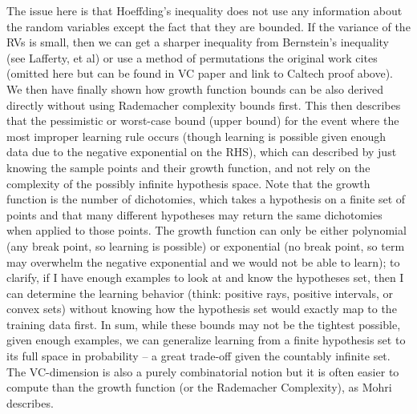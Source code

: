 \begin{flushleft}
	The issue here is that Hoeffding's inequality does not use any information
	about the random variables except the fact that they are bounded. If the
	variance of the RVs is small, then we can get a sharper inequality from
	Bernstein's inequality (see Lafferty, et al) or use a method of permutations
	the original work cites (omitted here but can be found in VC paper and link to
	Caltech proof above). We then have finally shown how growth function bounds can
	be also derived directly without using Rademacher complexity bounds first. This
	then describes that the pessimistic or worst-case bound (upper bound) for the
	event where the most improper learning rule occurs (though learning is possible
	given enough data due to the negative exponential on the RHS), which can
	described by just knowing the sample points and their growth function, and not
	rely on the complexity of the possibly infinite hypothesis space. Note that the
	growth function is the number of dichotomies, which takes a hypothesis on a
	finite set of points and that many different hypotheses may return the same
	dichotomies when applied to those points. The growth function can only be
	either polynomial (any break point, so learning is possible) or exponential (no
	break point, so term may overwhelm the negative exponential and we would not be
	able to learn); to clarify, if I have enough examples to look at and know the
	hypotheses set, then I can determine the learning behavior (think: positive
	rays, positive intervals, or convex sets) without knowing how the hypothesis
	set would exactly map to the training data first. In sum, while these bounds
	may not be the tightest possible, given enough examples, we can generalize
	learning from a finite hypothesis set to its full space in probability -- a
	great trade-off given the countably infinite set. The VC-dimension is also a
	purely combinatorial notion but it is often easier to compute than the growth
	function (or the Rademacher Complexity), as Mohri describes.\\


\end{flushleft}
